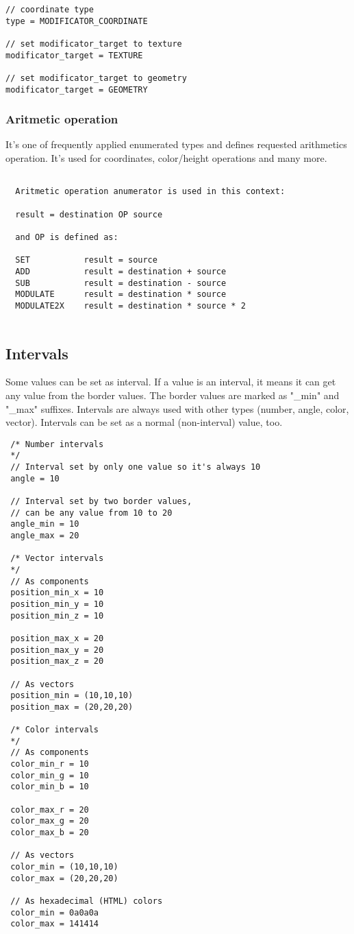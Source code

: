 \documentclass[11pt]{article}
\begin{document}
\begin{verbatim}
// coordinate type
type = MODIFICATOR_COORDINATE

// set modificator_target to texture
modificator_target = TEXTURE

// set modificator_target to geometry
modificator_target = GEOMETRY
\end{verbatim}

\subsubsection{Aritmetic operation}

It's one of frequently applied enumerated types and defines requested arithmetics
operation. It's used for coordinates, color/height operations and many more.

\begin{verbatim}  
  
  Aritmetic operation anumerator is used in this context:
  
  result = destination OP source
  
  and OP is defined as:

  SET           result = source
  ADD           result = destination + source
  SUB           result = destination - source
  MODULATE      result = destination * source
  MODULATE2X    result = destination * source * 2
    
\end{verbatim}

\subsection{Intervals}

Some values can be set as interval. If a value is an interval,
it means it can get any value from the border values. The border values
are marked as "\_min" and "\_max" suffixes. Intervals are always used
with other types (number, angle, color, vector). Intervals can be set 
as a normal (non-interval) value, too.

\begin{verbatim}
 /* Number intervals
 */
 // Interval set by only one value so it's always 10
 angle = 10

 // Interval set by two border values, 
 // can be any value from 10 to 20
 angle_min = 10
 angle_max = 20 
 
 /* Vector intervals
 */ 
 // As components
 position_min_x = 10
 position_min_y = 10
 position_min_z = 10
 
 position_max_x = 20
 position_max_y = 20
 position_max_z = 20

 // As vectors
 position_min = (10,10,10)
 position_max = (20,20,20)

 /* Color intervals
 */
 // As components
 color_min_r = 10
 color_min_g = 10
 color_min_b = 10
 
 color_max_r = 20
 color_max_g = 20
 color_max_b = 20
 
 // As vectors
 color_min = (10,10,10)
 color_max = (20,20,20)
 
 // As hexadecimal (HTML) colors
 color_min = 0a0a0a
 color_max = 141414

\end{verbatim}
\end{document}
